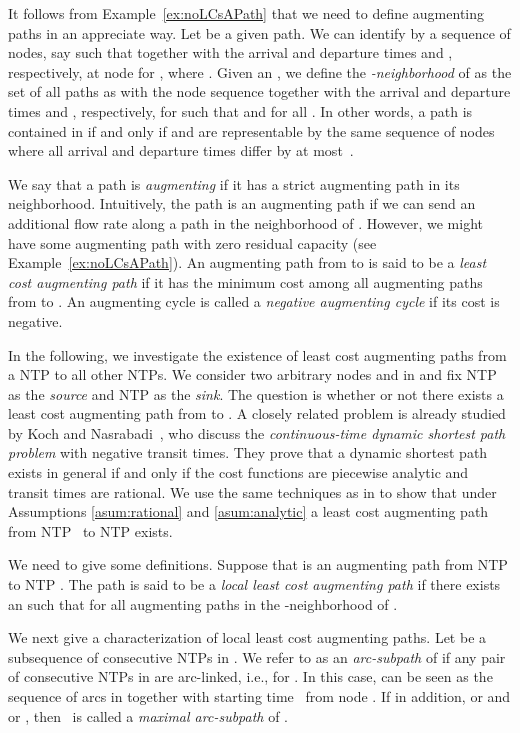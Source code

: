 \documentclass{svjour3}                     \smartqed
\begin{document}
It follows from Example~\ref{ex:noLCsAPath} that we need to define  augmenting paths in an appreciate way. Let  be a given path. We can identify  by a sequence of nodes, say  such that  together with the arrival and departure times  and , respectively, at node  for , where . Given an , we define the \emph{-neighborhood}  of  as the set of all paths as  with the node sequence  together with the arrival and departure times  and , respectively, for  such that  and  for all .
In other words, a path  is contained in  if and only if  and  are representable by the same sequence of nodes where all arrival and departure times differ by at most~. 

We say that a path is \emph{augmenting} if it has a strict augmenting path in its neighborhood. Intuitively, the path  is an augmenting path if we can send an additional flow rate along a path in the neighborhood of . However, we might have some augmenting path with zero residual capacity (see Example~\ref{ex:noLCsAPath}). An augmenting path  from  to  is said to be a \emph{least cost augmenting path} if it has the minimum cost among all augmenting paths from  to . An augmenting cycle is called a \emph{negative augmenting cycle} if its cost is negative.

In the following, we investigate the existence of least cost augmenting paths from a NTP to all other NTPs. 
We consider two arbitrary nodes  and  in  and fix NTP  as the \emph{source} and NTP  as the \emph{sink}. The question is whether or not there exists a least cost augmenting path from  to . A closely related problem is already studied by Koch and Nasrabadi~\cite{KochNasr10}, who discuss the \emph{continuous-time dynamic shortest path problem} with negative transit times. They prove that a dynamic shortest path exists in general if and only if the cost functions are piecewise analytic and transit times are rational. We use the same techniques as in \cite{KochNasr10} to show that under Assumptions \ref{asum:rational} and \ref{asum:analytic} a least cost augmenting path from NTP~ to NTP  exists.

We need to give some definitions. Suppose that  is an augmenting path from NTP  to NTP . The path  is said to be a \emph{local least cost augmenting path} if there exists an
 such that  for all augmenting paths  in the -neighborhood of .

We next give a characterization of local least cost augmenting paths. Let  be a subsequence of consecutive NTPs in . We refer to  as an \emph{arc-subpath} of  if any pair of consecutive NTPs in  are arc-linked, i.e.,  for . In this case,  can be seen as the sequence    of arcs in  together with starting time~ from node . If in addition,  or  and  or , then~ is called a \emph{maximal arc-subpath} of . 
\end{document}
